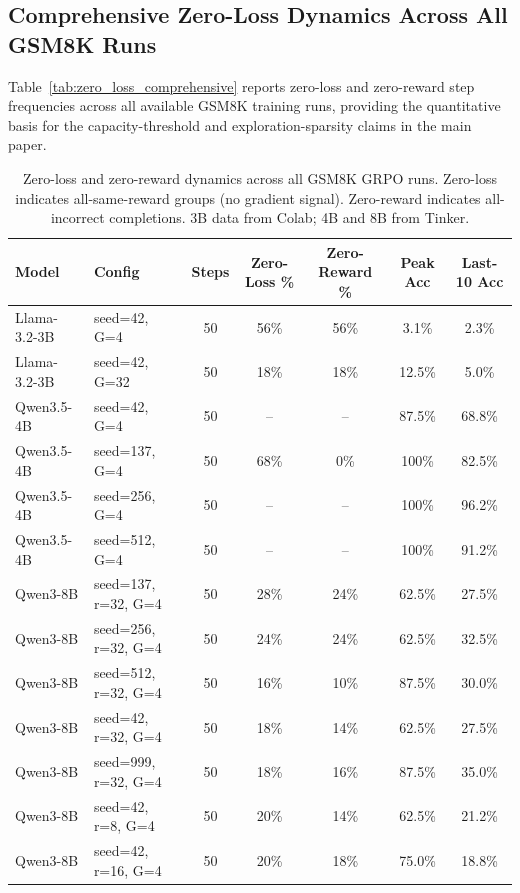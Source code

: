 \documentclass{article}
\begin{document}
\subsection{Comprehensive Zero-Loss Dynamics Across All GSM8K Runs}

Table~\ref{tab:zero_loss_comprehensive} reports zero-loss and zero-reward step frequencies across all available GSM8K training runs, providing the quantitative basis for the capacity-threshold and exploration-sparsity claims in the main paper.

\begin{table}[htbp]
    \centering
    \caption{Zero-loss and zero-reward dynamics across all GSM8K GRPO runs. Zero-loss indicates all-same-reward groups (no gradient signal). Zero-reward indicates all-incorrect completions. 3B data from Colab; 4B and 8B from Tinker.}
    \begin{tabular}{llccccc}
        \toprule
        Model & Config & Steps & Zero-Loss \% & Zero-Reward \% & Peak Acc & Last-10 Acc \\
        \midrule
        Llama-3.2-3B & seed=42, G=4 & 50 & 56\% & 56\% & 3.1\% & 2.3\% \\
        Llama-3.2-3B & seed=42, G=32 & 50 & 18\% & 18\% & 12.5\% & 5.0\% \\
        \midrule
        Qwen3.5-4B & seed=42, G=4 & 50 & -- & -- & 87.5\% & 68.8\% \\
        Qwen3.5-4B & seed=137, G=4 & 50 & 68\% & 0\% & 100\% & 82.5\% \\
        Qwen3.5-4B & seed=256, G=4 & 50 & -- & -- & 100\% & 96.2\% \\
        Qwen3.5-4B & seed=512, G=4 & 50 & -- & -- & 100\% & 91.2\% \\
        \midrule
        Qwen3-8B & seed=137, r=32, G=4 & 50 & 28\% & 24\% & 62.5\% & 27.5\% \\
        Qwen3-8B & seed=256, r=32, G=4 & 50 & 24\% & 24\% & 62.5\% & 32.5\% \\
        Qwen3-8B & seed=512, r=32, G=4 & 50 & 16\% & 10\% & 87.5\% & 30.0\% \\
        Qwen3-8B & seed=42, r=32, G=4 & 50 & 18\% & 14\% & 62.5\% & 27.5\% \\
        Qwen3-8B & seed=999, r=32, G=4 & 50 & 18\% & 16\% & 87.5\% & 35.0\% \\
        Qwen3-8B & seed=42, r=8, G=4 & 50 & 20\% & 14\% & 62.5\% & 21.2\% \\
        Qwen3-8B & seed=42, r=16, G=4 & 50 & 20\% & 18\% & 75.0\% & 18.8\% \\

\end{tabular}
\end{table}
\end{document}
